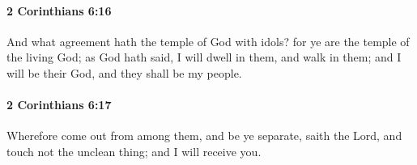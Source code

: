 		\paragraph{2 Corinthians 6:16} %
			\label{2CORINTHIANS-6-16}

			And what agreement hath the temple of God with idols?  for ye are the temple of the living God; as God hath said, I will dwell in them, and walk in them; and I will be their God, and they shall be my people.

			\begin{framed}
			\scriptsize
				\begin{compactdesc}
					\item[SBLG] 
				\end{compactdesc}
			\end{framed}

		\paragraph{2 Corinthians 6:17} %
			\label{2CORINTHIANS-6-17}

			Wherefore come out from among them, and be ye separate, saith the Lord, and touch not the unclean thing; and I will receive you.

